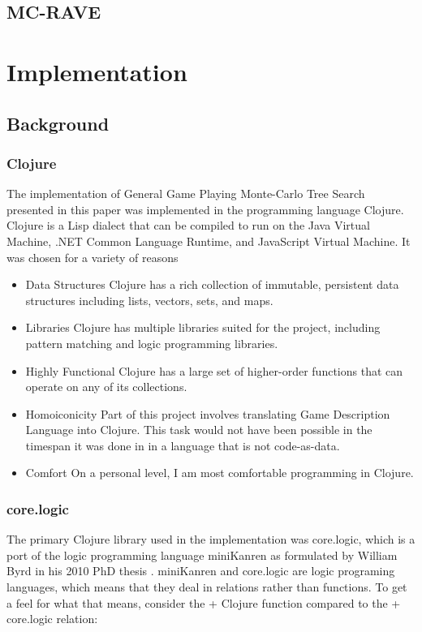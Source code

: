 \documentclass[letterpaper]{article}
\begin{document}
\subsection{MC-RAVE}

\section{Implementation}

\subsection{Background}

\subsubsection{Clojure}
The implementation of General Game Playing Monte-Carlo Tree Search presented in this paper was implemented in the programming language Clojure. Clojure is a Lisp dialect that can be compiled to run on the Java Virtual Machine, .NET Common Language Runtime, and JavaScript Virtual Machine. It was chosen for a variety of reasons
\begin{itemize}
\item Data Structures Clojure has a rich collection of immutable, persistent data structures including lists, vectors, sets, and maps.
\item Libraries Clojure has multiple libraries suited for the project, including pattern matching and logic programming libraries.
\item Highly Functional Clojure has a large set of higher-order functions that can operate on any of its collections.
\item Homoiconicity Part of this project involves translating Game Description Language into Clojure. This task would not have been possible in the timespan it was done in in a language that is not code-as-data.
\item Comfort On a personal level, I am most comfortable programming in Clojure.
\end{itemize}
\subsubsection{core.logic}
The primary Clojure library used in the implementation was core.logic, which is a port of the logic programming language miniKanren as formulated by William Byrd in his 2010 PhD thesis \cite{byrd2010relational}. miniKanren and core.logic are logic programing languages, which means that they deal in relations rather than functions. To get a feel for what that means, consider the + Clojure function compared to the + core.logic relation:
\end{document}
